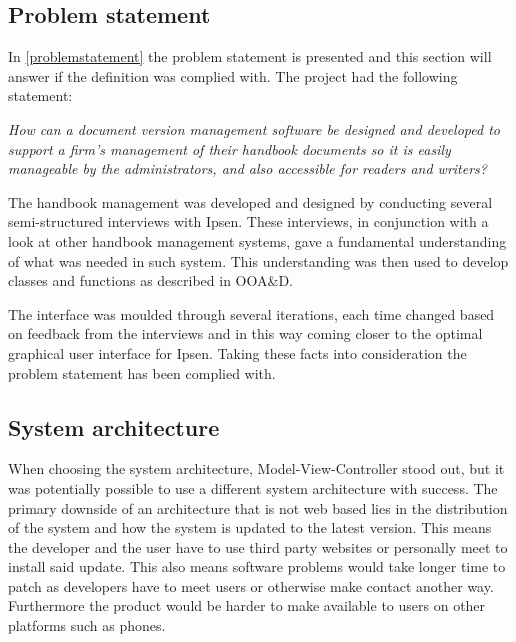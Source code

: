 


\subsection{Problem statement}
In \cref{problemstatement} the problem statement is presented and this section will answer if the definition was complied with. The project had the following statement:

\begin{center}
\textit{How can a document version management software be designed and developed to support a firm's management of their handbook documents so it is easily manageable by the administrators, and also accessible for readers and writers?}
\end{center}

The handbook management was developed and designed by conducting several semi-structured interviews with Ipsen. These interviews, in conjunction with a look at other handbook management systems, gave a fundamental understanding of what was needed in such system. This understanding was then used to develop classes and functions as described in OOA\&D\cite{Rod-Aalborg}.

The interface was moulded through several iterations, each time changed based on feedback from the interviews and in this way coming closer to the optimal graphical user interface for Ipsen. Taking these facts into consideration the problem statement has been complied with.

\subsection{System architecture}
When choosing the system architecture, Model-View-Controller stood out, but it was potentially possible to use a different system architecture with success. The primary downside of an architecture that is not web based lies in the distribution of the system and how the system is updated to the latest version. This means the developer and the user have to use third party websites or personally meet to install said update. This also means software problems would take longer time to patch as developers have to meet users or otherwise make contact another way. Furthermore the product would be harder to make available to users on other platforms such as phones.

